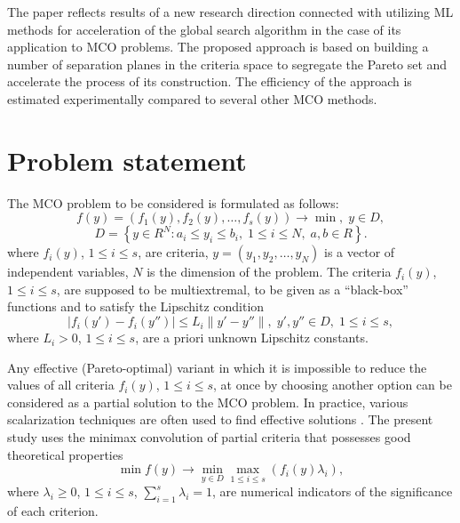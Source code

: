 \documentclass[runningheads]{llncs}
\begin{document}
The paper reflects results of a new research direction connected with utilizing ML methods for acceleration of the global search algorithm in the case of its application to MCO problems. The proposed approach is based on building a number of separation planes in the criteria space to segregate the Pareto set and accelerate the process of its construction. The efficiency of the approach is estimated experimentally compared to several other MCO methods.


\section{Problem statement}

The MCO problem to be considered is formulated as follows:
\begin{equation}
f(y)=(f_1 (y),f_2 (y),\dots ,f_s (y)) \to \min, \; y\in D,
\label{eq:1}
\end{equation}
\begin{equation}
D=\left\{ y \in R^N: a_i \leq y_i \leq b_i, \; 1 \leq i \leq N, \; a,b \in R \right\}.
\label{eq:2}
\end{equation}
where $f_i (y)$, $1 \leq i \leq s$, are  criteria, $y=(y_1,y_2, \dots,y_N)$ is a vector of independent variables, $N$ is the dimension of the problem. The criteria $f_i (y)$, $1 \leq i \leq s$, are supposed to be multiextremal, to be given as a ``black-box'' functions and to satisfy the Lipschitz condition
\begin{equation}
|f_i (y')-f_i (y'')| \leq L_i \|y'-y''\|, \; y',y'' \in D, \; 1 \leq i \leq s,
\label{eq:3}
\end{equation}
where $L_i>0$, $1 \leq i \leq s$, are a priori unknown Lipschitz constants.

Any effective (Pareto-optimal) variant  in which it is impossible to reduce the values of all criteria $f_i (y)$, $1 \leq i \leq s$, at once by choosing another option   can be considered as a partial solution to the MCO problem. In practice, various scalarization techniques are often used to find effective solutions \cite{Ehrgott2005,Pardalos2017,Marler2004,GergelKozinov2020}. The present study uses the minimax convolution of partial criteria that possesses good theoretical properties
\begin{equation}
\min{f(y)} \to \min_{y\in D}{\max_{1 \leq i \leq s}{(f_i (y) \lambda_i )}} ,
\label{eq:4}
\end{equation}
where $\lambda_i \geq 0$, $1 \leq i \leq s$, $\sum_{i=1}^s{\lambda_i}=1$, are numerical indicators of the significance of each criterion. 
\end{document}
